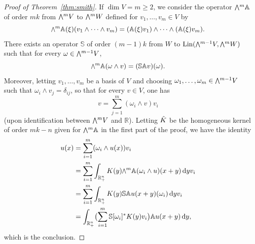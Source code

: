 \documentclass[a4paper,10pt]{amsart}
\newcommand{\R}{\mathbb R}
\newcommand\medwedge{\scalerel*{\bigwedge}{H_.}}
\newcommand{\dif}{\mathrm{d}}
\renewcommand{\dif}{\operatorname{d}\!}
\newcommand{\A}{\mathbb{A}}
\newcommand{\Lin}{\operatorname{Lin}}
\numberwithin{equation}{section}
\theoremstyle{remark}
\numberwithin{equation}{section}
\begin{document}
\begin{proof}[Proof of Theorem~\ref{thm:smith}]
		If \(\dim V = m \ge 2\), we consider the operator \(\medwedge^m \A\) of order \(mk\) from \(\medwedge^m V\) to \(\medwedge^m W\) defined for \(v_1, \dotsc, v_m \in V\) by
		\begin{equation*}
			\medwedge^m \A(\xi) (v_1 \wedge \dotsb \wedge v_m) 
			=
			(\A (\xi)v_1) \wedge \dotsb \wedge (\A (\xi) v_m).
		\end{equation*}
		There exists an operator \(\mathbb{S}\) of order \((m - 1)k\) from \(W\) to \(\Lin(\medwedge^{m - 1} V, \medwedge^{m} W)\) such that for every \(\omega \in \medwedge^{m - 1} V\),
		\begin{equation*}
			\medwedge^m \A (\omega \wedge v) = (\mathbb{S} \A v) (\omega). 
		\end{equation*}
		Moreover, letting \(v_1, \dotsc, v_m\) be a basis of \(V\) and choosing \(\omega_1, \dotsc, \omega_m \in \medwedge^{m - 1} V\) such that \(\omega_i \wedge v_j = \delta_{ij}\), so that for every \(v \in V\), one has 
		\begin{equation*}
			v = \sum_{j = 1}^m (\omega_i \wedge v) v_i
		\end{equation*}
		(upon identification between \(\medwedge^m V\) and \(\R\)).
		Letting \(\Hat{K}\) be the homogeneous kernel of order \(mk - n\) given for \(\medwedge^m \A\) in the first part of the proof, we have the identity
		\begin{equation*}
			\begin{split}
				u (x) &= \sum_{i = 1}^m  (\omega_i \wedge u (x)) v_i\\
				&= \sum_{i = 1}^m \int_{\R^n_+} K (y) \medwedge^m \A (\omega_i \wedge u) (x + y) \dif y v_i\\
				&= \sum_{i = 1}^m \int_{\R^n_+} K (y)  \mathbb{S} \A u (x + y) (\omega_i)\dif y v_i\\
				&= \int_{\R^n_+} \bigl(\sum_{i = 1}^m \mathbb{S}[\omega_i]^* K (y) v_i\bigr)  \A u (x + y)\dif y,
			\end{split}
		\end{equation*}
		which is the conclusion.
	\end{proof}
	
\end{document}

